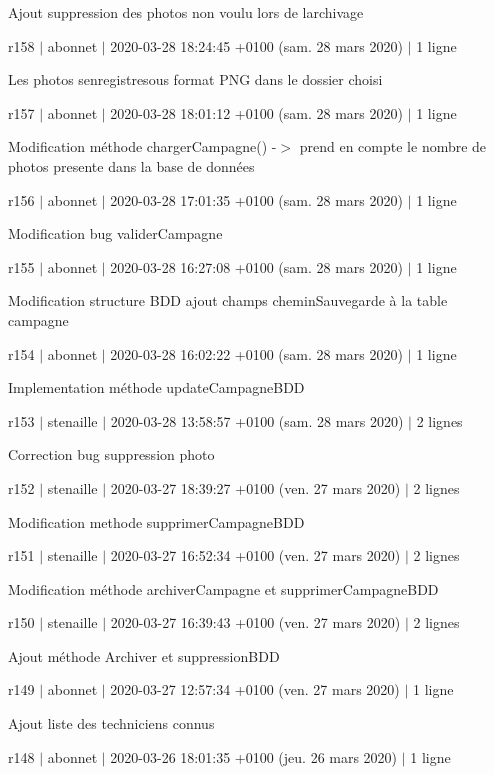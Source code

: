 Ajout suppression des photos non voulu lors de l\textquotesingle{}archivage

r158 $\vert$ abonnet $\vert$ 2020-\/03-\/28 18\+:24\+:45 +0100 (sam. 28 mars 2020) $\vert$ 1 ligne

Les photos s\textquotesingle{}enregistresous format P\+NG dans le dossier choisi

r157 $\vert$ abonnet $\vert$ 2020-\/03-\/28 18\+:01\+:12 +0100 (sam. 28 mars 2020) $\vert$ 1 ligne

Modification méthode charger\+Campagne() -\/$>$ prend en compte le nombre de photos presente dans la base de données

r156 $\vert$ abonnet $\vert$ 2020-\/03-\/28 17\+:01\+:35 +0100 (sam. 28 mars 2020) $\vert$ 1 ligne

Modification bug valider\+Campagne

r155 $\vert$ abonnet $\vert$ 2020-\/03-\/28 16\+:27\+:08 +0100 (sam. 28 mars 2020) $\vert$ 1 ligne

Modification structure B\+DD ajout champs chemin\+Sauvegarde à la table campagne

r154 $\vert$ abonnet $\vert$ 2020-\/03-\/28 16\+:02\+:22 +0100 (sam. 28 mars 2020) $\vert$ 1 ligne

Implementation méthode update\+Campagne\+B\+DD

r153 $\vert$ stenaille $\vert$ 2020-\/03-\/28 13\+:58\+:57 +0100 (sam. 28 mars 2020) $\vert$ 2 lignes

Correction bug suppression photo

r152 $\vert$ stenaille $\vert$ 2020-\/03-\/27 18\+:39\+:27 +0100 (ven. 27 mars 2020) $\vert$ 2 lignes

Modification methode supprimer\+Campagne\+B\+DD

r151 $\vert$ stenaille $\vert$ 2020-\/03-\/27 16\+:52\+:34 +0100 (ven. 27 mars 2020) $\vert$ 2 lignes

Modification méthode archiver\+Campagne et supprimer\+Campagne\+B\+DD

r150 $\vert$ stenaille $\vert$ 2020-\/03-\/27 16\+:39\+:43 +0100 (ven. 27 mars 2020) $\vert$ 2 lignes

Ajout méthode Archiver et suppression\+B\+DD

r149 $\vert$ abonnet $\vert$ 2020-\/03-\/27 12\+:57\+:34 +0100 (ven. 27 mars 2020) $\vert$ 1 ligne

Ajout liste des techniciens connus

r148 $\vert$ abonnet $\vert$ 2020-\/03-\/26 18\+:01\+:35 +0100 (jeu. 26 mars 2020) $\vert$ 1 ligne

